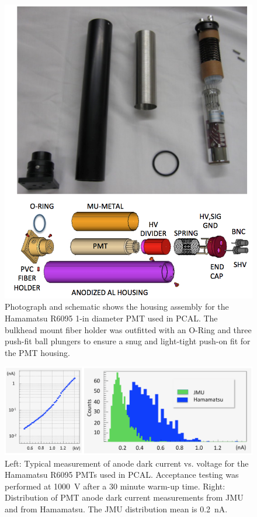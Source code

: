 \begin{figure}[hbt]
\centering
\includegraphics[width=0.85\columnwidth,keepaspectratio]{img/S4_PMT.png}
\caption{Photograph and schematic shows the housing assembly for the Hamamatsu R6095 1-in diameter PMT
  used in PCAL.  The bulkhead mount fiber holder was outfitted with an O-Ring and three push-fit ball plungers to ensure a snug and light-tight push-on fit for the PMT housing.}
\label{fig:S4_PMT}
\end{figure}

\begin{figure}[hbt]
\centering
\includegraphics[width=1.0\columnwidth,keepaspectratio]{img/S4_PMT_2.png}
\caption{Left: Typical measurement of anode dark current vs. voltage for the Hamamatsu R6095 PMTs used in
  PCAL. Acceptance testing was performed at 1000~V after a 30 minute warm-up time. Right: Distribution of PMT anode dark current
  measurements from JMU and from Hamamatsu. The JMU distribution mean is 0.2~nA.}
\label{fig:S4_PMT_2}
\end{figure}

